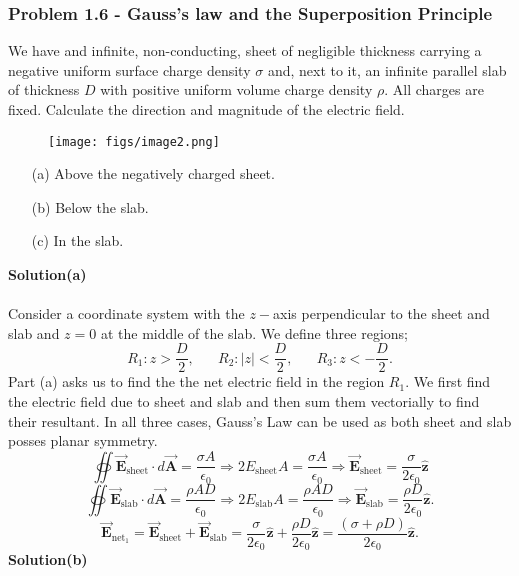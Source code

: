 \documentclass{article}
\begin{document}
\subsubsection*{Problem 1.6 - Gauss's law and the Superposition Principle}
We have and infinite, non-conducting, sheet of negligible thickness carrying a negative uniform surface charge density $\sigma$ and, next to it, an infinite parallel slab of thickness $D$ with positive uniform volume charge density $\rho$. All charges are fixed. Calculate the direction and magnitude of the electric field.
 \begin{figure}[h]
        \centering
        \texttt{[image: figs/image2.png]}
    \end{figure}
\begin{enumerate}
    \item[(a)]Above the negatively charged sheet.
    \item[(b)]Below the slab.
    \item[(c)]In the slab.
\end{enumerate}
\textbf{Solution(a)}
\\
\\Consider a coordinate system with the $z-$axis perpendicular to the sheet and slab and $z=0$ at the middle of the slab. We define three regions;
\[R_1: z>\frac{D}{2},\,\,\,\,\,\,\,\,\,\,R_2:|z|<\frac{D}{2},\,\,\,\,\,\,\,\,\,\,R_3:z<-\frac{D}{2}.\]
Part (a) asks us to find the the net electric field in the region $R_1$. We first find the electric field due to sheet and slab and then sum them vectorially to find their resultant. In all three cases, Gauss's Law can be used as both sheet and slab posses planar symmetry. 
\[\oiint\Vec{\boldsymbol{E}}_{\text{sheet}}\cdot d\Vec{\boldsymbol{A}}=\frac{\sigma A}{\epsilon_0}\Rightarrow2E_{\text{sheet}}A=\frac{\sigma A}{\epsilon_0}\Rightarrow\Vec{\boldsymbol{E}}_{\text{sheet}}=\frac{\sigma}{2\epsilon_0}\boldsymbol{\hat{z}}\]
\[\oiint\Vec{\boldsymbol{E}}_{\text{slab}}\cdot d\Vec{\boldsymbol{A}}=\frac{\rho AD}{\epsilon_0}\Rightarrow2E_{\text{slab}}A=\frac{\rho AD}{\epsilon_0}\Rightarrow\Vec{\boldsymbol{E}}_{\text{slab}}=\frac{\rho D}{2\epsilon_0}\boldsymbol{\hat{z}}.\]
\[\Vec{\boldsymbol{E}}_{\text{net}_1}=\Vec{\boldsymbol{E}}_{\text{sheet}}+\Vec{\boldsymbol{E}}_{\text{slab}}=\frac{\sigma}{2\epsilon_0}\boldsymbol{\hat{z}}+\frac{\rho D}{2\epsilon_0}\boldsymbol{\hat{z}}=\frac{(\sigma+\rho D)}{2\epsilon_0}\boldsymbol{\hat{z}}.\]
\textbf{Solution(b)}
\\
\end{document}
